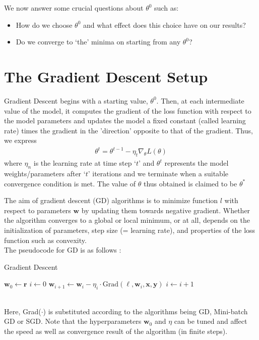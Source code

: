 \documentclass[12pt]{article}
\begin{document}
We now answer some crucial questions about $\theta^0$ such as:
\begin{itemize}
    \item How do we choose $\theta^0$ and what effect does this choice have on our results?
    \item Do we converge to `the' minima on starting from any $\theta^0$?
\end{itemize}

\section{The Gradient Descent Setup}
Gradient Descent begins with a starting value, $\theta^0$. Then, at each intermediate value of the model, it computes the gradient of the loss function with respect to the model parameters and updates the model a fixed constant (called learning rate) times the gradient in the 'direction' opposite to that of the gradient. Thus, we express
\begin{gather}
    \theta^t = \theta^{t-1} - \eta_t \nabla_\theta L(\theta)
\end{gather}
where $\eta_n$ is the learning rate at time step `$t$' and $\theta^t$ represents the model weights/parameters after `$t$' iterations and we terminate when a suitable convergence condition is met. The value of $\theta$ thus obtained is claimed to be $\theta^\ast$ 

The aim of gradient descent (GD) algorithms is to minimize function $l$ with respect to parameters $\mathbf{w}$ by updating them towards negative gradient. Whether the algorithm converges to a global or local minimum, or at all, depends on the initialization of parameters, step size (= learning rate), and properties of the loss function such as convexity. 
\\
The pseudocode for GD is as follows :
\begin{algorithm}
  \caption{Gradient Descent}\label{gd}
  \begin{algorithmic}[1]
      \State $\mathbf{w}_0 \gets \mathbf{r}$
      \State $i \gets 0$
        \State $\mathbf{w}_{i+1} \gets \mathbf{w}_i - \eta_i \cdot \text{Grad}(\ell, \mathbf{w}_i, \mathbf{x}, \mathbf{y})$
        \State $i \gets i+1$
      \EndWhile\label{gdwhile}
  \end{algorithmic}
\end{algorithm}\\
Here, Grad($\cdot$) is substituted according to the algorithms being GD, Mini-batch GD or SGD.
Note that the hyperparameters $\mathbf{w}_0$ and $\eta$ can be tuned and affect the speed as well as convergence result of the algorithm (in finite steps).
\end{document}
